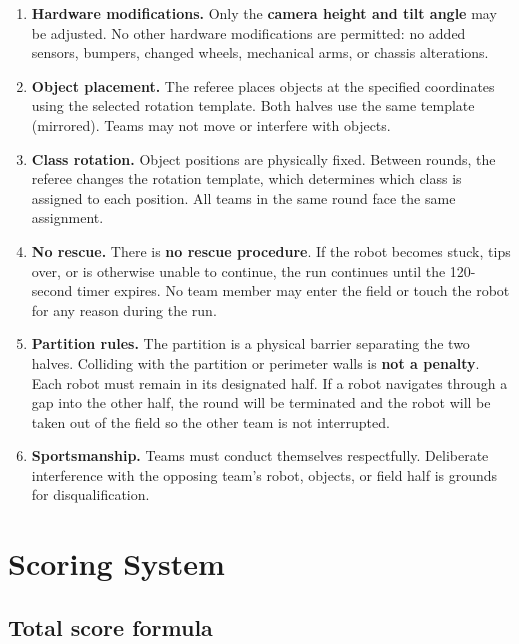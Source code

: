 \documentclass[a4]{article}
\begin{document}
\begin{enumerate}[label=\textbf{R\arabic*.}, leftmargin=2.5em]
\item \textbf{Hardware modifications.} Only the \textbf{camera height and tilt angle} may be adjusted. No other hardware modifications are permitted: no added sensors, bumpers, changed wheels, mechanical arms, or chassis alterations.

\item \textbf{Object placement.} The referee places objects at the specified coordinates using the selected rotation template. Both halves use the same template (mirrored). Teams may not move or interfere with objects.

\item \textbf{Class rotation.} Object positions are physically fixed. Between rounds, the referee changes the rotation template, which determines which class is assigned to each position. All teams in the same round face the same assignment.

\item \textbf{No rescue.} There is \textbf{no rescue procedure}. If the robot becomes stuck, tips over, or is otherwise unable to continue, the run continues until the 120-second timer expires. No team member may enter the field or touch the robot for any reason during the run.

\item \textbf{Partition rules.} The partition is a physical barrier separating the two halves. Colliding with the partition or perimeter walls is \textbf{not a penalty}. Each robot must remain in its designated half. If a robot navigates through a gap into the other half, the round will be terminated and the robot will be taken out of the field so the other team is not interrupted. 

\item \textbf{Sportsmanship.} Teams must conduct themselves respectfully. Deliberate interference with the opposing team's robot, objects, or field half is grounds for disqualification.

\end{enumerate}

\pagebreak
\section{Scoring System}

\subsection*{Total score formula}
\end{document}
